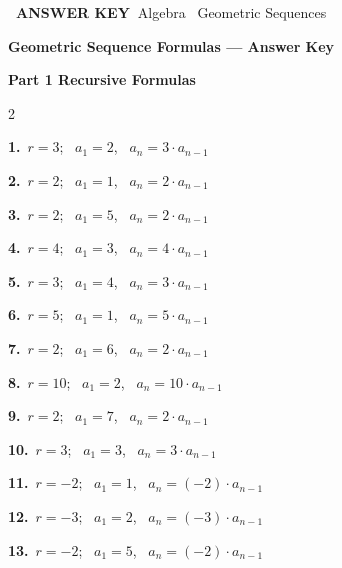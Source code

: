 \documentclass[11pt,letterpaper]{article}
\newcommand{\sectionbar}[2]{\needspace{6cm}\par\vspace{4mm}
  \begin{tcolorbox}[enhanced,colback=fmtitle,colframe=fmtitle,arc=2mm,
    left=4mm,top=1.5mm,bottom=1.5mm]
  \color{white}\bfseries\large #1\hfill{\normalsize\mdseries #2}
  \end{tcolorbox}}
\begin{document}
\colorbox{fmwatch}{\color{white}\bfseries\small\ ANSWER KEY\ }\hfill{\small\color{fmgray}Algebra \textperiodcentered\ Geometric Sequences}\par\vspace{4mm}
{\color{fmtitle}\LARGE\bfseries Geometric Sequence Formulas --- Answer Key}\par\vspace{1mm}
\sectionbar{Part 1 \quad Recursive Formulas}{}
\begin{multicols}{2}\raggedright
{\color{fmwatch}\bfseries 1.}\ $r=3$; \ $a_1=2$, \ $a_n=3\cdot a_{n-1}$\par\vspace{2.2mm}
{\color{fmwatch}\bfseries 2.}\ $r=2$; \ $a_1=1$, \ $a_n=2\cdot a_{n-1}$\par\vspace{2.2mm}
{\color{fmwatch}\bfseries 3.}\ $r=2$; \ $a_1=5$, \ $a_n=2\cdot a_{n-1}$\par\vspace{2.2mm}
{\color{fmwatch}\bfseries 4.}\ $r=4$; \ $a_1=3$, \ $a_n=4\cdot a_{n-1}$\par\vspace{2.2mm}
{\color{fmwatch}\bfseries 5.}\ $r=3$; \ $a_1=4$, \ $a_n=3\cdot a_{n-1}$\par\vspace{2.2mm}
{\color{fmwatch}\bfseries 6.}\ $r=5$; \ $a_1=1$, \ $a_n=5\cdot a_{n-1}$\par\vspace{2.2mm}
{\color{fmwatch}\bfseries 7.}\ $r=2$; \ $a_1=6$, \ $a_n=2\cdot a_{n-1}$\par\vspace{2.2mm}
{\color{fmwatch}\bfseries 8.}\ $r=10$; \ $a_1=2$, \ $a_n=10\cdot a_{n-1}$\par\vspace{2.2mm}
{\color{fmwatch}\bfseries 9.}\ $r=2$; \ $a_1=7$, \ $a_n=2\cdot a_{n-1}$\par\vspace{2.2mm}
{\color{fmwatch}\bfseries 10.}\ $r=3$; \ $a_1=3$, \ $a_n=3\cdot a_{n-1}$\par\vspace{2.2mm}
{\color{fmwatch}\bfseries 11.}\ $r=-2$; \ $a_1=1$, \ $a_n=(-2)\cdot a_{n-1}$\par\vspace{2.2mm}
{\color{fmwatch}\bfseries 12.}\ $r=-3$; \ $a_1=2$, \ $a_n=(-3)\cdot a_{n-1}$\par\vspace{2.2mm}
{\color{fmwatch}\bfseries 13.}\ $r=-2$; \ $a_1=5$, \ $a_n=(-2)\cdot a_{n-1}$\par\vspace{2.2mm}

\end{multicols}
\end{document}
